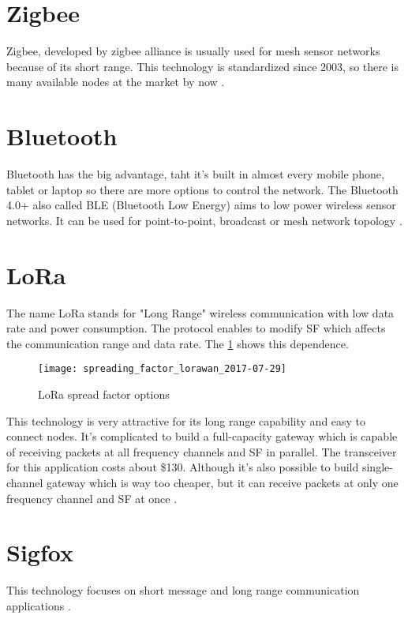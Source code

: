 \section{Zigbee}
Zigbee, developed by zigbee alliance is usually used for mesh sensor networks because of its short range. This technology is standardized since 2003, so there is many available nodes at the market by now \cite{10} \cite{11} \cite{12}.

\section{Bluetooth}
Bluetooth has the big advantage, taht it's built in almost every mobile phone, tablet or laptop so there are more options to control the network. The Bluetooth 4.0+ also called BLE (Bluetooth Low Energy) aims to low power wireless sensor networks.
It can be used for point-to-point, broadcast or mesh network topology \cite{13} \cite{14} \cite{15} \cite{16}.


\section{LoRa}
The name LoRa stands for "Long Range" wireless communication with low data rate and power consumption. The protocol enables to modify SF which affects the communication range and data rate. The \ref{fig:loraSF} shows this dependence.

\begin{figure}[!h]
    \centering
    \texttt{[image: spreading\_factor\_lorawan\_2017-07-29]}
    \caption{LoRa spread factor options \cite{24}}
    \label{fig:loraSF}
\end{figure}

This technology is very attractive for its long range capability and easy to connect nodes. It's complicated to build a full-capacity gateway which is capable of receiving packets at all frequency channels and SF in parallel. The transceiver for this application costs about \$130. Although it's also possible to build single-channel gateway which is way too cheaper, but it can receive packets at only one frequency channel and SF at once \cite{17} \cite{18} \cite{19} \cite{20} \cite{21} \cite{22} \cite{23} \cite{24}.


\section{Sigfox}
This technology focuses on short message and long range communication applications \cite{25} \cite{26}.


